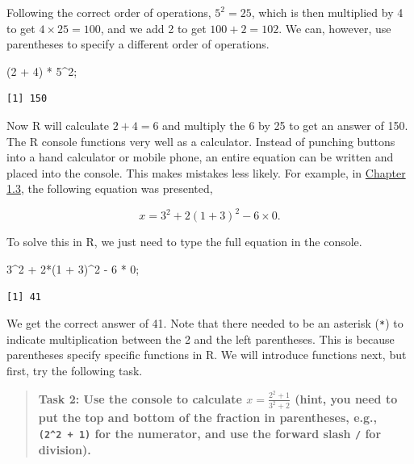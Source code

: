 \documentclass[
]{scrbook}
\newenvironment{Shaded}{\begin{snugshade}}{\end{snugshade}}
\newcommand{\DecValTok}[1]{\textcolor[rgb]{0.00,0.00,0.81}{#1}}
\newcommand{\NormalTok}[1]{#1}
\newcommand{\SpecialCharTok}[1]{\textcolor[rgb]{0.00,0.00,0.00}{#1}}
\begin{document}
Following the correct order of operations, \(5^{2} = 25\), which is then multiplied by 4 to get \(4 \times 25 = 100\), and we add 2 to get \(100 + 2 = 102\).
We can, however, use parentheses to specify a different order of operations.

\begin{Shaded}
\begin{Highlighting}[]
\NormalTok{(}\DecValTok{2} \SpecialCharTok{+} \DecValTok{4}\NormalTok{) }\SpecialCharTok{*} \DecValTok{5}\SpecialCharTok{\^{}}\DecValTok{2}\NormalTok{;  }
\end{Highlighting}
\end{Shaded}

\begin{verbatim}
[1] 150
\end{verbatim}

Now R will calculate \(2 + 4 = 6\) and multiply the 6 by 25 to get an answer of 150.
The R console functions very well as a calculator.
Instead of punching buttons into a hand calculator or mobile phone, an entire equation can be written and placed into the console.
This makes mistakes less likely.
For example, in \protect\hyperlink{order-of-operations}{Chapter 1.3}, the following equation was presented,

\[x = 3^{2} + 2(1 + 3)^{2} - 6 \times 0.\]

To solve this in R, we just need to type the full equation in the console.

\begin{Shaded}
\begin{Highlighting}[]
\DecValTok{3}\SpecialCharTok{\^{}}\DecValTok{2} \SpecialCharTok{+} \DecValTok{2}\SpecialCharTok{*}\NormalTok{(}\DecValTok{1} \SpecialCharTok{+} \DecValTok{3}\NormalTok{)}\SpecialCharTok{\^{}}\DecValTok{2} \SpecialCharTok{{-}} \DecValTok{6} \SpecialCharTok{*} \DecValTok{0}\NormalTok{;}
\end{Highlighting}
\end{Shaded}

\begin{verbatim}
[1] 41
\end{verbatim}

We get the correct answer of 41.
Note that there needed to be an asterisk (\texttt{*}) to indicate multiplication between the 2 and the left parentheses.
This is because parentheses specify specific functions in R.
We will introduce functions next, but first, try the following task.

\begin{quote}
\textbf{Task 2: Use the console to calculate \(x = \frac{2^2 + 1}{3^2 + 2}\) (hint, you need to put the top and bottom of the fraction in parentheses, e.g., \texttt{(2\^{}2\ +\ 1)} for the numerator, and use the forward slash \texttt{/} for division).}
\end{quote}
\end{document}
